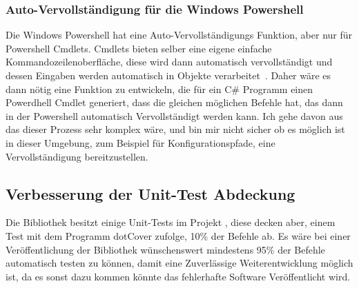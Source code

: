 \subsubsection{Auto-Vervollständigung für die Windows Powershell}
Die Windows Powershell hat eine Auto-Vervollständigungs Funktion, aber nur für Powershell Cmdlets.
Cmdlets bieten selber eine eigene einfache Kommandozeilenoberfläche, diese wird dann automatisch vervollständigt und dessen Eingaben werden automatisch in Objekte verarbeitet~\cite{CustomCmdlet}.
Daher wäre es dann nötig eine Funktion zu entwickeln, die für ein C\# Programm einen Powerdhell Cmdlet generiert, dass die gleichen möglichen Befehle hat, 
das dann in der Powershell automatisch Vervollständigt werden kann.
  Ich gehe davon aus das dieser Prozess sehr komplex wäre, und bin mir nicht sicher ob es möglich ist in dieser Umgebung, zum Beispiel für Konfigurationspfade, eine Vervollständigung bereitzustellen.
\subsection{Verbesserung der Unit-Test Abdeckung}\label{subsec:MoreUnitTests}
Die Bibliothek besitzt einige Unit-Tests im Projekt , diese decken aber, einem Test mit dem Programm dotCover zufolge, 10\% der Befehle ab.
Es wäre bei einer Veröffentlichung der Bibliothek wünschenswert mindestens 95\% der Befehle automatisch testen zu können, damit eine Zuverlässige Weiterentwicklung möglich ist, 
da es sonst dazu kommen könnte das fehlerhafte Software Veröffentlicht wird.
